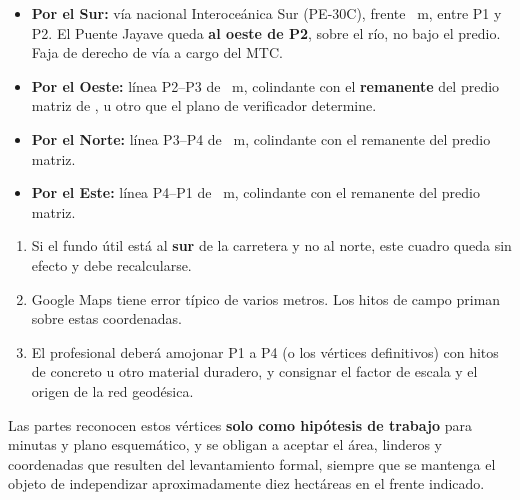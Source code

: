 \documentclass[12pt,a4paper]{article}
\begin{document}
\begin{itemize}[leftmargin=1.15cm]
\item \textbf{Por el Sur:} vía nacional Interoceánica Sur (PE-30C), frente \FrenteM\ m, entre P1 y P2. El Puente Jayave queda \textbf{al oeste de P2}, sobre el río, no bajo el predio. Faja de derecho de vía a cargo del MTC.
\item \textbf{Por el Oeste:} línea P2--P3 de \FondoM\ m, colindante con el \textbf{remanente} del predio matriz de \VendedorNombreCompleto, u otro que el plano de verificador determine.
\item \textbf{Por el Norte:} línea P3--P4 de \FrenteM\ m, colindante con el remanente del predio matriz.
\item \textbf{Por el Este:} línea P4--P1 de \FondoM\ m, colindante con el remanente del predio matriz.
\end{itemize}

\begin{enumerate}[leftmargin=1.15cm]
\item Si el fundo útil está al \textbf{sur} de la carretera y no al norte, este cuadro queda sin efecto y debe recalcularse.
\item Google Maps tiene error típico de varios metros. Los hitos de campo priman sobre estas coordenadas.
\item El profesional deberá amojonar P1 a P4 (o los vértices definitivos) con hitos de concreto u otro material duradero, y consignar el factor de escala y el origen de la red geodésica.
\end{enumerate}

Las partes reconocen estos vértices \textbf{solo como hipótesis de trabajo} para minutas y plano esquemático, y se obligan a aceptar el área, linderos y coordenadas que resulten del levantamiento formal, siempre que se mantenga el objeto de independizar aproximadamente diez hectáreas en el frente indicado.

\LugarFecha
{}

\vspace{0.7em}
\noindent
{}
\end{document}
